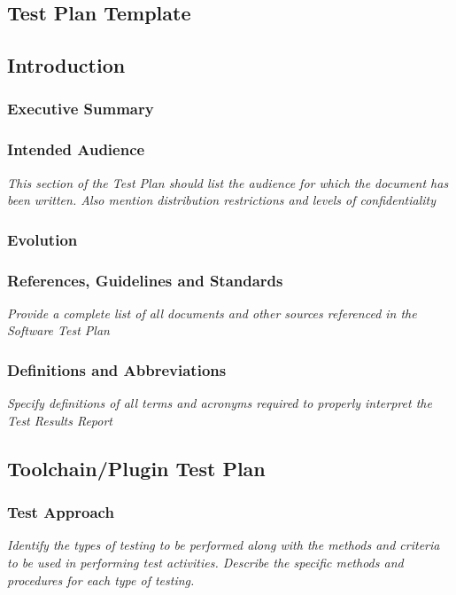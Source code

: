 \newpage
\begin{appendices}
   \addappheadtotoc
   \appendixpage

\section{Test Plan Template}
\label{ref:test_plan_template}

\subsection{Introduction}
\subsubsection{Executive Summary}
\subsubsection{Intended Audience}
\textit{This section of the Test Plan should list the audience for which the document has been written. Also mention distribution restrictions and levels of confidentiality}
\subsubsection{Evolution}
\subsubsection{References, Guidelines and Standards}
\textit{Provide a complete list of all documents and other sources referenced in the Software Test Plan}
\subsubsection{Definitions and Abbreviations}
\textit{Specify definitions of all terms and acronyms required to properly interpret the Test Results Report}

\subsection{Toolchain/Plugin Test Plan}
\subsubsection{Test Approach}
\textit{Identify the types of testing to be performed along with the methods and criteria to be used in performing test activities. Describe the specific methods and procedures for each type of testing.}

\end{appendices}
